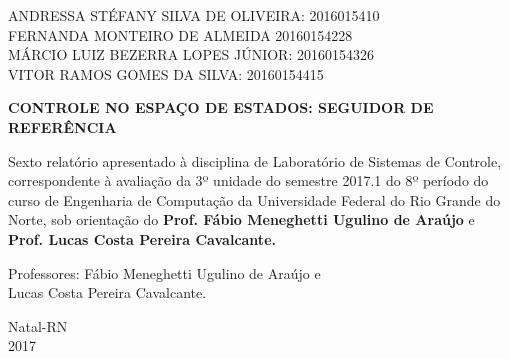 \documentclass[a4paper,12pt]{article}
\begin{document}
\newpage


\thispagestyle{empty}

\begin{center}
\begin{normalsize}
ANDRESSA STÉFANY SILVA DE OLIVEIRA: 2016015410\\
\vspace{0.8cm}
FERNANDA MONTEIRO DE ALMEIDA 20160154228\\
\vspace{0.8cm}
MÁRCIO LUIZ BEZERRA LOPES JÚNIOR: 20160154326\\
\vspace{0.8cm}
VITOR RAMOS GOMES DA SILVA: 20160154415\\

\end{normalsize}
\end{center}
\vspace{3cm}

{\bf{\large {\centering CONTROLE NO ESPAÇO DE ESTADOS: SEGUIDOR DE REFERÊNCIA\\}}}

\vspace{4cm}

\begin{adjustwidth}{7.5cm}{0cm}

{\normalsize
Sexto relatório apresentado à disciplina de
Laboratório de Sistemas de Controle, correspondente à
avaliação da 3º unidade do semestre 2017.1 do 8º período
do curso de Engenharia de Computação da
Universidade Federal do Rio Grande do Norte, sob
orientação do {\bf Prof. Fábio Meneghetti Ugulino de
Araújo} e {\bf Prof. Lucas Costa Pereira Cavalcante.}

}

\end{adjustwidth}

\vspace{2cm}

\begin{center}

Professores:  Fábio Meneghetti Ugulino de Araújo e\\
Lucas Costa Pereira Cavalcante.

\vspace{2.5cm}

{\large Natal-RN\\
2017}

\end{center}
\end{document}

